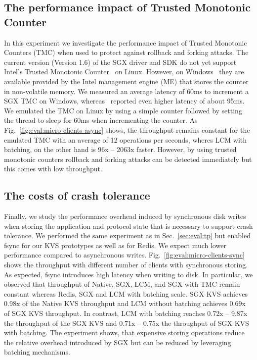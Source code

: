 \documentclass[11pt]{article}
\theoremstyle{plain-boldhead}
\theoremstyle{definition-boldhead}
\begin{document}
\subsection{The performance impact of Trusted Monotonic Counter}

In this experiment we investigate the performance impact of Trusted Monotonic
Counters (TMC) when used to protect against rollback and forking attacks. The
current version (Version 1.6) of the \ac{SGX} driver and SDK do not yet support
Intel's Trusted
% 
Monotonic Counter~\cite{sgx-sdk-linux} on Linux.  However, on Windows~\cite
{sgx-sdk-win} they are available provided by the Intel management engine (ME)
that stores the counter in non-volatile memory.
%
We measured an average latency of 60ms to increment a \ac{SGX} TMC on Windows,
whereas~\cite{strpie16} reported even higher latency of about 95ms. We
emulated the TMC on Linux by using a simple counter followed by setting the
thread to sleep for 60ms when incrementing the counter.
% 
As Fig.~\ref{fig:eval:micro-clients-async} shows, the throughput remains
constant for the emulated TMC with an average of 12 operations per seconds,
wheres LCM with batching, on the other hand is 96x -- 2063x faster.  
% 
However, by using trusted monotonic counters rollback
and forking attacks can be detected immediately but this comes with low
throughput.


\subsection{The costs of crash tolerance}

Finally, we study the performance overhead induced by synchronous disk writes
when storing the application and protocol state that is necessary to support
crash tolerance.
%
We performed the same experiment as in Sec.~\ref{sec:eval:tp} but enabled
fsync for our KVS prototypes as well as for Redis.  We expect much lower
performance compared to asynchronous writes.
% 
Fig.~\ref{fig:eval:micro-clients-sync} shows the throughput with different
number of clients with synchronous storing.  As expected, fsync introduces high
latency when writing to disk. In particular, we observed that throughput of
Native, \ac{SGX}, LCM, and \ac{SGX} with TMC remain constant whereas Redis, \ac{SGX} and
LCM with batching scale.  \ac{SGX} KVS achieves 0.98x of the Native KVS throughput
and LCM without batching achieves 0.69x of \ac{SGX} KVS throughput.  In contrast,
LCM with batching reaches 0.72x -- 9.87x the throughput of the \ac{SGX} KVS and
0.71x -- 0.75x the throughput of \ac{SGX} KVS with batching.
% 
The experiment shows, that expensive storing operations reduce the relative
overhead introduced by \ac{SGX} but can be reduced by leveraging batching
mechanisms.
\end{document}
